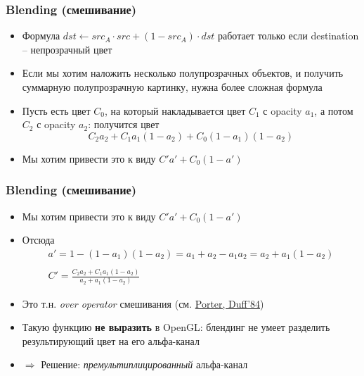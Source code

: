 \documentclass[10pt]{beamer}
\begin{document}
\begin{frame}[fragile]
\frametitle{Blending (смешивание)}
\begin{itemize}
\item Формула \begin{math}
dst \leftarrow src_A \cdot src + (1 - src_A) \cdot dst
\end{math} работает только если destination -- непрозрачный цвет
\pause
\item Если мы хотим наложить несколько полупрозрачных объектов, и получить суммарную полупрозрачную картинку, нужна более сложная формула
\pause
\item Пусть есть цвет \begin{math}C_0\end{math}, на который накладывается цвет \begin{math}C_1\end{math} с opacity \begin{math}a_1\end{math}, а потом \begin{math}C_2\end{math} с opacity \begin{math}a_2\end{math}: получится цвет
\pause
\begin{equation*}
C_2a_2 + C_1a_1(1-a_2) + C_0(1-a_1)(1-a_2)
\end{equation*}
\pause
\item Мы хотим привести это к виду \begin{math}C'a' + C_0(1-a')\end{math}
\end{itemize}
\end{frame}

\begin{frame}[fragile]
\frametitle{Blending (смешивание)}
\begin{itemize}
\item Мы хотим привести это к виду \begin{math}C'a' + C_0(1-a')\end{math}
\pause
\item Отсюда
\begin{equation*}
\begin{matrix}
a' = 1-(1-a_1)(1-a_2) = a_1+a_2-a_1a_2=a_2+a_1(1-a_2) \\
\\
C' = \frac{C_2a_2+C_1a_1(1-a_2)}{a_2+a_1(1-a_2)}
\end{matrix}
\end{equation*}
\pause
\item Это т.н. \textit{over operator} смешивания (см. \href{https://graphics.pixar.com/library/Compositing/paper.pdf}{Porter, Duff'84})
\pause
\item Такую функцию \textbf{не выразить} в OpenGL: блендинг не умеет разделить результирующий цвет на его альфа-канал
\pause
\item \begin{math}\Longrightarrow\end{math} Решение: \textit{премультиплицированный} альфа-канал
\end{itemize}
\end{frame}
\end{document}
